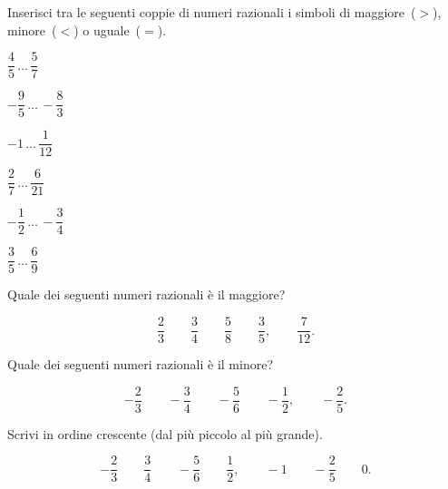 \subsubsection*{}

\begin{esercizio}
 \label{ese:3.29}
Inserisci tra le seguenti coppie di numeri razionali i simboli di 
maggiore~($>$), minore~($<$) o uguale~($=$).
\begin{multicols}{3}
\begin{enumeratea}
\spazielenx
 \item $\dfrac{4}{5}\,\ldots\,\dfrac{5}{7}$
 \item $-\dfrac{9}{5}\,\ldots\,-\dfrac{8}{3}$
 \item $-1\,\ldots\,\dfrac{1}{12}$
 \item $\dfrac{2}{7}\,\ldots\,\dfrac{6}{21}$
 \item $-\dfrac{1}{2}\,\ldots\,-\dfrac{3}{4}$
 \item $\dfrac{3}{5}\,\ldots\,\dfrac{6}{9}$
\end{enumeratea}
\end{multicols}
\end{esercizio}

\begin{esercizio}
 \label{ese:3.30}
Quale dei seguenti numeri razionali è il maggiore?

\[\frac{2}{3} \qquad \frac{3}{4} \qquad \frac{5}{8} \qquad \frac{3}{5},
\qquad\frac{7}{12}.\]
\end{esercizio}


\begin{esercizio}
 \label{ese:3.31}
Quale dei seguenti numeri razionali è il minore?

\[-\frac{2}{3} \qquad -\frac{3}{4} \qquad -\frac{5}{6} \qquad -\frac{1}{2},
\qquad-\frac{2}{5}.\]
\end{esercizio}

\begin{esercizio}
 \label{ese:3.32}
Scrivi in ordine crescente (dal più piccolo al più grande).

\[-\frac{2}{3} \qquad \frac{3}{4} \qquad -\frac{5}{6} \qquad \frac{1}{2},
\qquad-1 \qquad -\frac{2}{5} \qquad 0.\]
\end{esercizio}

